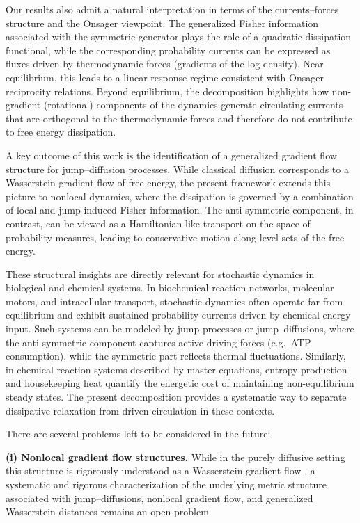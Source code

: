 \documentclass[10pt]{article}
\theoremstyle{definition}
\numberwithin{equation}{section}
\begin{document}
Our results also admit a natural interpretation in terms of the currents--forces structure and the Onsager viewpoint. 
The generalized Fisher information associated with the symmetric generator plays the role of a quadratic dissipation functional, while the corresponding probability currents can be expressed as fluxes driven by thermodynamic forces (gradients of the log-density). 
Near equilibrium, this leads to a linear response regime consistent with Onsager reciprocity relations. 
Beyond equilibrium, the decomposition highlights how non-gradient (rotational) components of the dynamics generate circulating currents that are orthogonal to the thermodynamic forces and therefore do not contribute to free energy dissipation.

A key outcome of this work is the identification of a generalized gradient flow structure for jump--diffusion processes. 
While classical diffusion corresponds to a Wasserstein gradient flow of free energy, the present framework extends this picture to nonlocal dynamics, where the dissipation is governed by a combination of local and jump-induced Fisher information. 
The anti-symmetric component, in contrast, can be viewed as a Hamiltonian-like transport on the space of probability measures, leading to conservative motion along level sets of the free energy.

These structural insights are directly relevant for stochastic dynamics in biological and chemical systems. 
In biochemical reaction networks, molecular motors, and intracellular transport, stochastic dynamics often operate far from equilibrium and exhibit sustained probability currents driven by chemical energy input. 
Such systems can be modeled by jump processes or jump--diffusions, where the anti-symmetric component captures active driving forces (e.g.\ ATP consumption), while the symmetric part reflects thermal fluctuations. 
Similarly, in chemical reaction systems described by master equations, entropy production and housekeeping heat quantify the energetic cost of maintaining non-equilibrium steady states. 
The present decomposition provides a systematic way to separate dissipative relaxation from driven circulation in these contexts.

There are several problems left to be considered in the future:

\medskip
\noindent
\textbf{(i) Nonlocal gradient flow structures.}
While in the purely diffusive setting this structure is rigorously understood as a Wasserstein gradient flow \cite{AGS05}, a systematic and rigorous characterization of the underlying metric structure associated with jump–diffusions, nonlocal gradient flow, and generalized Wasserstein distances remains an open problem.
\end{document}
